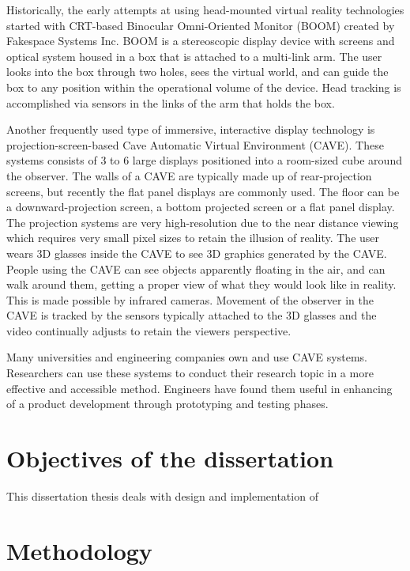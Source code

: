 Historically, the early attempts at using head-mounted virtual reality technologies started with CRT-based Binocular Omni-Oriented Monitor (BOOM) created by Fakespace Systems Inc. BOOM is a stereoscopic display device with screens and optical system housed in a box that is attached to a multi-link arm. The user looks into the box through two holes, sees the virtual world, and can guide the box to any position within the operational volume of the device. Head tracking is accomplished via sensors in the links of the arm that holds the box.

Another frequently used type of immersive, interactive display technology is projection-screen-based Cave Automatic Virtual Environment (CAVE). These systems consists of 3 to 6 large displays positioned into a room-sized cube around the observer. The walls of a CAVE are typically made up of rear-projection screens, but recently the flat panel displays are commonly used. The floor can be a downward-projection screen, a bottom projected screen or a flat panel display. The projection systems are very high-resolution due to the near distance viewing which requires very small pixel sizes to retain the illusion of reality. The user wears 3D glasses inside the CAVE to see 3D graphics generated by the CAVE. People using the CAVE can see objects apparently floating in the air, and can walk around them, getting a proper view of what they would look like in reality. This is made possible by infrared cameras. Movement of the observer in the CAVE is tracked by the sensors typically attached to the 3D glasses and the video continually adjusts to retain the viewers perspective.

Many universities and engineering companies own and use CAVE systems. Researchers can use these systems to conduct their research topic in a more effective and accessible method. Engineers have found them useful in enhancing of a product development through prototyping and testing phases.

\section{Objectives of the dissertation}
This dissertation thesis deals with design and implementation of 

\section{Methodology}


